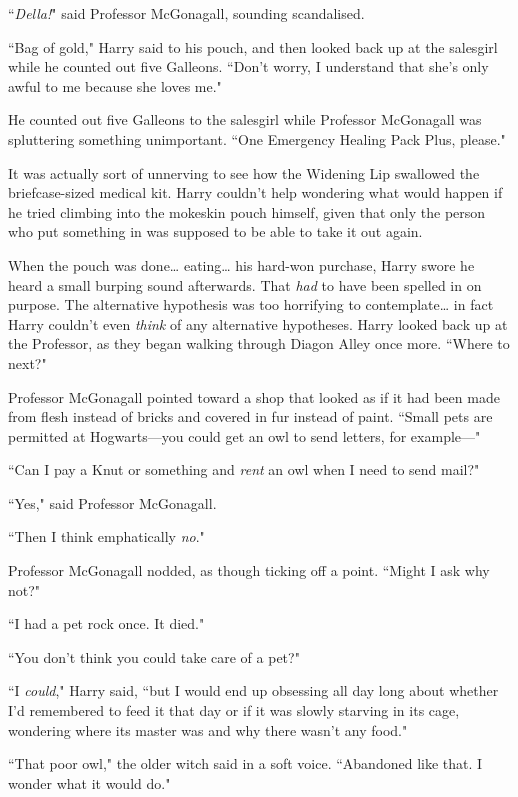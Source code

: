 ``\emph{Della!}" said Professor McGonagall, sounding scandalised.

``Bag of gold," Harry said to his pouch, and then looked back up at the salesgirl while he counted out five Galleons. ``Don't worry, I understand that she's only awful to me because she loves me."

He counted out five Galleons to the salesgirl while Professor McGonagall was spluttering something unimportant. ``One Emergency Healing Pack Plus, please."

It was actually sort of unnerving to see how the Widening Lip swallowed the briefcase-sized medical kit. Harry couldn't help wondering what would happen if he tried climbing into the mokeskin pouch himself, given that only the person who put something in was supposed to be able to take it out again.

When the pouch was done{\ldots} eating{\ldots} his hard-won purchase, Harry swore he heard a small burping sound afterwards. That \emph{had} to have been spelled in on purpose. The alternative hypothesis was too horrifying to contemplate{\ldots} in fact Harry couldn't even \emph{think} of any alternative hypotheses. Harry looked back up at the Professor, as they began walking through Diagon Alley once more. ``Where to next?"

Professor McGonagall pointed toward a shop that looked as if it had been made from flesh instead of bricks and covered in fur instead of paint. ``Small pets are permitted at Hogwarts—you could get an owl to send letters, for example—"

``Can I pay a Knut or something and \emph{rent} an owl when I need to send mail?"

``Yes," said Professor McGonagall.

``Then I think emphatically \emph{no}."

Professor McGonagall nodded, as though ticking off a point. ``Might I ask why not?"

``I had a pet rock once. It died."

``You don't think you could take care of a pet?"

``I \emph{could}," Harry said, ``but I would end up obsessing all day long about whether I'd remembered to feed it that day or if it was slowly starving in its cage, wondering where its master was and why there wasn't any food."

``That poor owl," the older witch said in a soft voice. ``Abandoned like that. I wonder what it would do."

